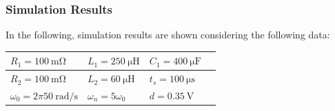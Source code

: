 \documentclass[11pt,a4paper,oneside]{book}
\numberwithin{equation}{section}
\theoremstyle{it}
\theoremstyle{definition}
\begin{document}
\subsubsection{Simulation Results}
In the following, simulation results are shown considering the following data:
\setlength\arrayrulewidth{1pt}
\begin{center}
	\setlength{\extrarowheight}{6pt}
	\begin{tabular}{ | m{10em} | m{10em} | m{10em} | m{10em} |}
		\hline
		$R_{1} = \SI{100}{\milli\ohm}$ & $L_{1}= \SI{250}{\micro\henry}$ & 
		$C_{1}= \SI{400}{\micro\farad}$  \\[6pt]
		\hline
		$R_{2} = \SI{100}{\milli\ohm}$ & $L_{2}= \SI{60}{\micro\henry}$ & $t_s 
		= \SI{100}{\micro\second}$ \\[6pt]
		\hline
		$\omega_0 = 2\pi\SI{50}{\radian\per\second}$ & $\omega_n = 5\omega_0$ & 
		$d = \SI{0.35}{\volt}$ \\[6pt]
		\hline
	\end{tabular}
	\captionsetup{width=0.5\textwidth, font=small}		
	\label{inv_data}
\end{center}
\end{document}
